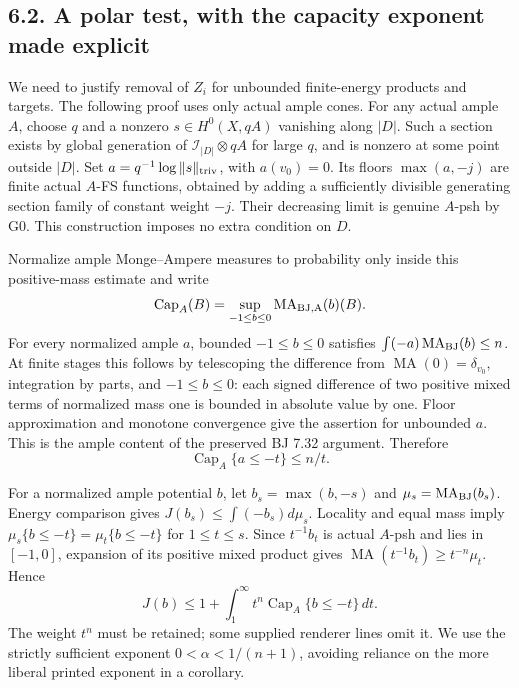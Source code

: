 \documentclass[
  10pt,
]{article}
\begin{document}
\subsection{6.2. A polar test, with the capacity exponent made
explicit}\label{a-polar-test-with-the-capacity-exponent-made-explicit}

We need to justify removal of \(Z_i\) for unbounded finite-energy
products and targets. The following proof uses only actual ample cones.
For any actual ample \(A\), choose \(q\) and a nonzero
\(s\in H^0(X,qA)\) vanishing along \(|D|\). Such a section exists by
global generation of \(\mathcal I_{|D|}\otimes qA\) for large \(q\), and
is nonzero at some point outside \(|D|\). Set
\(a=q^{-1}\log\|s\|_{\rm triv}\), with \(a(v_0)=0\). Its floors
\(\max(a,-j)\) are finite actual \(A\)-FS functions, obtained by adding
a sufficiently divisible generating section family of constant weight
\(-j\). Their decreasing limit is genuine \(A\)-psh by G0. This
construction imposes no extra condition on \(D\).

Normalize ample Monge--Ampere measures to probability only inside this
positive-mass estimate and write
\[\operatorname{Cap}_A(B)=\sup_{-1\leq b\leq0}\operatorname{MA}_{\rm BJ,A}(b)(B).\]
For every normalized ample \(a\), bounded \(-1\leq b\leq0\) satisfies
\(\int(-a)\operatorname{MA}_{\rm BJ}(b)\leq n\). At finite stages this
follows by telescoping the difference from
\(\operatorname{MA}(0)=\delta_{v_0}\), integration by parts, and
\(-1\leq b\leq0\): each signed difference of two positive mixed terms of
normalized mass one is bounded in absolute value by one. Floor
approximation and monotone convergence give the assertion for unbounded
\(a\). This is the ample content of the preserved BJ 7.32 argument.
Therefore \[\operatorname{Cap}_A\{a\leq-t\}\leq n/t.\tag{6.3}\]

For a normalized ample potential \(b\), let \(b_s=\max(b,-s)\) and
\(\mu_s=\operatorname{MA}_{\rm BJ}(b_s)\). Energy comparison gives
\(J(b_s)\leq\int(-b_s)d\mu_s\). Locality and equal mass imply
\(\mu_s\{b\leq-t\}=\mu_t\{b\leq-t\}\) for \(1\leq t\leq s\). Since
\(t^{-1}b_t\) is actual \(A\)-psh and lies in \([-1,0]\), expansion of
its positive mixed product gives
\(\operatorname{MA}(t^{-1}b_t)\geq t^{-n}\mu_t\). Hence
\[J(b)\leq1+\int_1^\infty t^n\operatorname{Cap}_A\{b\leq-t\}\,dt.\tag{6.4}\]
The weight \(t^n\) must be retained; some supplied renderer lines omit
it. We use the strictly sufficient exponent \(0<\alpha<1/(n+1)\),
avoiding reliance on the more liberal printed exponent in a corollary.
\end{document}
